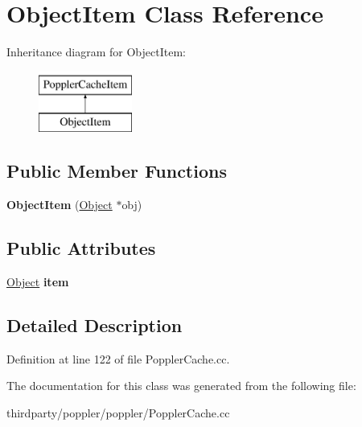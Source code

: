 \hypertarget{class_object_item}{}\section{Object\+Item Class Reference}
\label{class_object_item}
Inheritance diagram for Object\+Item\+:\begin{figure}[H]
\begin{center}
\leavevmode
\includegraphics[height=2.000000cm]{class_object_item}
\end{center}
\end{figure}
\subsection*{Public Member Functions}
\begin{DoxyCompactItemize}
\item 
\mbox{\label{class_object_item_a672a4e295bf1860634ba1b1bc362a88d}} 
{\bfseries Object\+Item} (\hyperlink{class_object}{Object} $\ast$obj)
\end{DoxyCompactItemize}
\subsection*{Public Attributes}
\begin{DoxyCompactItemize}
\item 
\mbox{\label{class_object_item_af099b0a10e7e0adc0034b0ee6e15ccfc}} 
\hyperlink{class_object}{Object} {\bfseries item}
\end{DoxyCompactItemize}


\subsection{Detailed Description}


Definition at line 122 of file Poppler\+Cache.\+cc.



The documentation for this class was generated from the following file\+:\begin{DoxyCompactItemize}
\item 
thirdparty/poppler/poppler/Poppler\+Cache.\+cc\end{DoxyCompactItemize}
